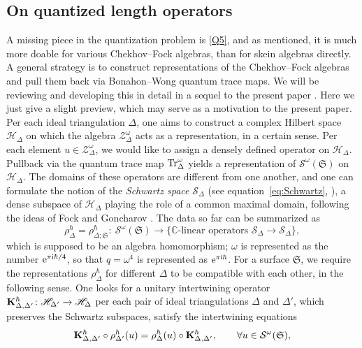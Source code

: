 \documentclass[pdftex]{sigma}
\numberwithin{equation}{section}
\theoremstyle{definition}
\begin{document}
\subsection{On quantized length operators}
\label{subsec:on_quantized_length_operators}
A missing piece in the quantization problem is \ref{Q5}, and as mentioned, it is much more doable for various Chekhov--Fock algebras, than for skein algebras directly. A general strategy is to construct representations of the Chekhov--Fock algebras and pull them back via Bonahon--Wong quantum trace maps. We will be reviewing and developing this in detail in a sequel to the present paper \cite{sequel}. Here we just give a slight preview, which may serve as a motivation to the present paper. Per each ideal triangulation $\Delta$, one aims to construct a complex Hilbert space $\mathscr{H}_\Delta$ on which the algebra $\mathcal{Z}^\omega_\Delta$ acts as a representation, in a certain sense. Per each element $u \in \mathcal{Z}^\omega_\Delta$, we would like to assign a densely defined operator on $\mathscr{H}_\Delta$. Pullback via the quantum trace map ${\rm Tr}^\omega_\Delta$ yields a representation of $\mathcal{S}^\omega(\mathfrak{S})$ on $\mathscr{H}_\Delta$. The domains of these operators are different from one another, and one can formulate the notion of the {\it Schwartz space} $\mathscr{S}_\Delta$ (see equation~\eqref{eq:Schwartz}, \cite[Definition~5.2]{FG09}), a dense subspace of $\mathscr{H}_\Delta$ playing the role of a common maximal domain, following the ideas of Fock and Goncharov \cite{FG09}. The data so far can be summarized as
\[
\rho^\hbar_\Delta = \rho^\hbar_{\Delta;\mathfrak{S}} \colon \ \mathcal{S}^\omega(\mathfrak{S}) \to \{\mbox{$\mathbb{C}$-linear operators $\mathscr{S}_\Delta \to \mathscr{S}_\Delta$}\},
\]
which is supposed to be an algebra homomorphism; $\omega$ is represented as the number ${\rm e}^{\pi {\rm i} \hbar/4}$, so that $q=\omega^4$ is represented as ${\rm e}^{\pi {\rm i} \hbar}$. For a surface $\mathfrak{S}$, we require the representations $\rho^\hbar_\Delta$ for different $\Delta$ to be compatible with each other, in the following sense. One looks for a unitary intertwining operator ${\bf K}^\hbar_{\Delta,\Delta'} \colon \mathscr{H}_{\Delta'} \to \mathscr{H}_\Delta$ per each pair of ideal triangulations $\Delta$ and $\Delta'$, which preserves the Schwartz subspaces, satisfy the intertwining equations
\[
{\bf K}^\hbar_{\Delta,\Delta'} \circ \rho^\hbar_{\Delta'}(u) = \rho^\hbar_\Delta(u) \circ {\bf K}^\hbar_{\Delta,\Delta'}, \qquad \forall u \in \mathcal{S}^\omega(\mathfrak{S}),
\]
\end{document}
